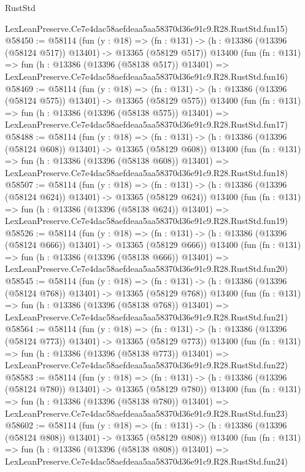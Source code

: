 \begin{lexlean}{RustStd}
\begin{coremodule}
    LexLeanPreserve.Ce7e4dac58aefdeaa5aa58370d36e91c9.R28.RustStd.fun15)
@58450 := @58114
    (fun (y : @18) =>
    (fn : @131) -> (h : @13386 (@13396 (@58124 @517)) @13401) -> @13365 (@58129 @517))
    @13400
    (fun (fn : @131) =>
    fun (h : @13386 (@13396 (@58138 @517)) @13401) =>
    LexLeanPreserve.Ce7e4dac58aefdeaa5aa58370d36e91c9.R28.RustStd.fun16)
@58469 := @58114
    (fun (y : @18) =>
    (fn : @131) -> (h : @13386 (@13396 (@58124 @575)) @13401) -> @13365 (@58129 @575))
    @13400
    (fun (fn : @131) =>
    fun (h : @13386 (@13396 (@58138 @575)) @13401) =>
    LexLeanPreserve.Ce7e4dac58aefdeaa5aa58370d36e91c9.R28.RustStd.fun17)
@58488 := @58114
    (fun (y : @18) =>
    (fn : @131) -> (h : @13386 (@13396 (@58124 @608)) @13401) -> @13365 (@58129 @608))
    @13400
    (fun (fn : @131) =>
    fun (h : @13386 (@13396 (@58138 @608)) @13401) =>
    LexLeanPreserve.Ce7e4dac58aefdeaa5aa58370d36e91c9.R28.RustStd.fun18)
@58507 := @58114
    (fun (y : @18) =>
    (fn : @131) -> (h : @13386 (@13396 (@58124 @624)) @13401) -> @13365 (@58129 @624))
    @13400
    (fun (fn : @131) =>
    fun (h : @13386 (@13396 (@58138 @624)) @13401) =>
    LexLeanPreserve.Ce7e4dac58aefdeaa5aa58370d36e91c9.R28.RustStd.fun19)
@58526 := @58114
    (fun (y : @18) =>
    (fn : @131) -> (h : @13386 (@13396 (@58124 @666)) @13401) -> @13365 (@58129 @666))
    @13400
    (fun (fn : @131) =>
    fun (h : @13386 (@13396 (@58138 @666)) @13401) =>
    LexLeanPreserve.Ce7e4dac58aefdeaa5aa58370d36e91c9.R28.RustStd.fun20)
@58545 := @58114
    (fun (y : @18) =>
    (fn : @131) -> (h : @13386 (@13396 (@58124 @768)) @13401) -> @13365 (@58129 @768))
    @13400
    (fun (fn : @131) =>
    fun (h : @13386 (@13396 (@58138 @768)) @13401) =>
    LexLeanPreserve.Ce7e4dac58aefdeaa5aa58370d36e91c9.R28.RustStd.fun21)
@58564 := @58114
    (fun (y : @18) =>
    (fn : @131) -> (h : @13386 (@13396 (@58124 @773)) @13401) -> @13365 (@58129 @773))
    @13400
    (fun (fn : @131) =>
    fun (h : @13386 (@13396 (@58138 @773)) @13401) =>
    LexLeanPreserve.Ce7e4dac58aefdeaa5aa58370d36e91c9.R28.RustStd.fun22)
@58583 := @58114
    (fun (y : @18) =>
    (fn : @131) -> (h : @13386 (@13396 (@58124 @780)) @13401) -> @13365 (@58129 @780))
    @13400
    (fun (fn : @131) =>
    fun (h : @13386 (@13396 (@58138 @780)) @13401) =>
    LexLeanPreserve.Ce7e4dac58aefdeaa5aa58370d36e91c9.R28.RustStd.fun23)
@58602 := @58114
    (fun (y : @18) =>
    (fn : @131) -> (h : @13386 (@13396 (@58124 @808)) @13401) -> @13365 (@58129 @808))
    @13400
    (fun (fn : @131) =>
    fun (h : @13386 (@13396 (@58138 @808)) @13401) =>
    LexLeanPreserve.Ce7e4dac58aefdeaa5aa58370d36e91c9.R28.RustStd.fun24)

\end{coremodule}
\end{lexlean}
